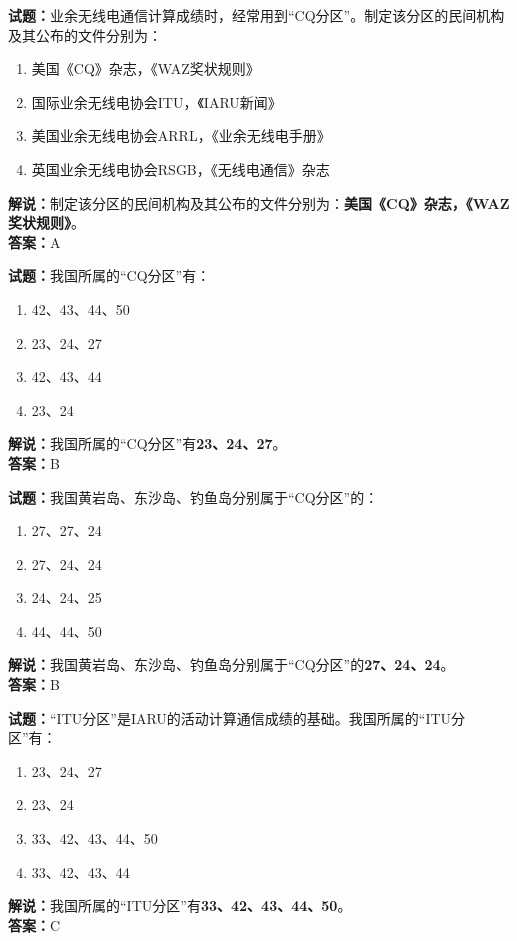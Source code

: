 \documentclass{ctexbook}
\begin{document}
\bigskip


\noindent\textbf{试题：}业余无线电通信计算成绩时，经常用到“CQ分区”。制定该分区的民间机构及其公布的文件分别为：
\begin{enumerate}[leftmargin=3em]
\item 美国《CQ》杂志，《WAZ奖状规则》
\item 国际业余无线电协会ITU，《IARU新闻》
\item 美国业余无线电协会ARRL，《业余无线电手册》
\item 英国业余无线电协会RSGB，《无线电通信》杂志
\end{enumerate}
\noindent\textbf{解说：}制定该分区的民间机构及其公布的文件分别为：\textbf{美国《CQ》杂志，《WAZ奖状规则》}。\\\noindent\textbf{答案：}A



\bigskip


\noindent\textbf{试题：}我国所属的“CQ分区”有：
\begin{enumerate}[leftmargin=3em]
\item 42、43、44、50
\item 23、24、27
\item 42、43、44
\item 23、24
\end{enumerate}
\noindent\textbf{解说：}我国所属的“CQ分区”有\textbf{23、24、27}。\\\noindent\textbf{答案：}B



\bigskip


\noindent\textbf{试题：}我国黄岩岛、东沙岛、钓鱼岛分别属于“CQ分区”的：
\begin{enumerate}[leftmargin=3em]
\item 27、27、24
\item 27、24、24
\item 24、24、25
\item 44、44、50
\end{enumerate}
\noindent\textbf{解说：}我国黄岩岛、东沙岛、钓鱼岛分别属于“CQ分区”的\textbf{27、24、24}。\\\noindent\textbf{答案：}B


\bigskip


\noindent\textbf{试题：}“ITU分区”是IARU的活动计算通信成绩的基础。我国所属的“ITU分区”有：
\begin{enumerate}[leftmargin=3em]
\item 23、24、27
\item 23、24
\item 33、42、43、44、50
\item 33、42、43、44
\end{enumerate}
\noindent\textbf{解说：}我国所属的“ITU分区”有\textbf{33、42、43、44、50}。\\\noindent\textbf{答案：}C
\end{document}

